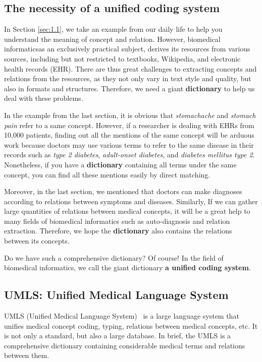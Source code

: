 \subsection{The necessity of a unified coding system}
In Section \ref{sec:1.1}, we take an example from our daily life to help you understand the meaning of concept and relation. However, biomedical informaticsas an exclusively practical subject, derives its resources from various sources, including but not restricted to textbooks, Wikipedia, and electronic health records (EHR). There are thus great challenges to extracting concepts and relations from the resources, as they not only vary in text style and quality, but also in formats and structures. Therefore, we need a giant \textbf{dictionary} to help us deal with these problems.

In the example from the last section, it is obvious that \emph{stomachache} and \emph{stomach pain} refer to a same concept. However, if a researcher is dealing with EHRs from 10,000 patients, finding out all the mentions of the same concept will be arduous work because doctors may use various terms to refer to the same disease in their records such as \emph{type 2 diabetes}, \emph{adult-onset diabetes}, and \emph{diabetes mellitus type 2}. Nonetheless, if you have a \textbf{dictionary} containing all terms under the same concept, you can find all these mentions easily by direct matching.

Moreover, in the last section, we mentioned that doctors can make diagnoses according to relations between symptoms and diseases. Similarly, If we can gather large quantities of relations between medical concepts, it will be a great help to many fields of biomedical informatics such as auto-diagnosis and relation extraction. Therefore, we hope the \textbf{dictionary} also contains the relations between its concepts.

Do we have such a comprehensive dictionary? Of course! In the field of biomedical informatics, we call the giant dictionary \textbf{a unified coding system}. 


\subsection{UMLS: Unified Medical Language System}
UMLS (Unified Medical Language System)~\cite{10.1093/nar/gkh061} is a large language system that unifies medical concept coding, typing, relations between medical concepts, etc. It is not only a standard, but also a large database. In brief, the UMLS is a comprehensive dictionary containing considerable medical terms and relations between them. 

